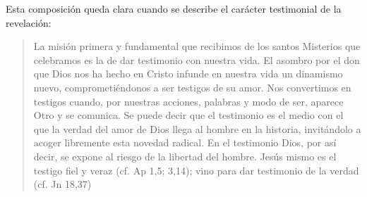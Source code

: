 Esta composición queda clara cuando se describe el carácter testimonial de la revelación: \blockquote[][\,(SCa 85)]{La misión primera y fundamental que recibimos de los santos Misterios que celebramos es la de dar testimonio con nuestra vida. El asombro por el don que Dios nos ha hecho en Cristo infunde en nuestra vida un dinamismo nuevo, comprometiéndonos a ser testigos de su amor. Nos convertimos en testigos cuando, por nuestras acciones, palabras y modo de ser, aparece Otro y se comunica. Se puede decir que el testimonio es el medio con el que la verdad del amor de Dios llega al hombre en la historia, invitándolo a acoger libremente esta novedad radical. En el testimonio Dios, por así decir, se expone al riesgo de la libertad del hombre. Jesús mismo es el testigo fiel y veraz (cf. Ap 1,5; 3,14); vino para dar testimonio de la verdad (cf. Jn 18,37)}.

